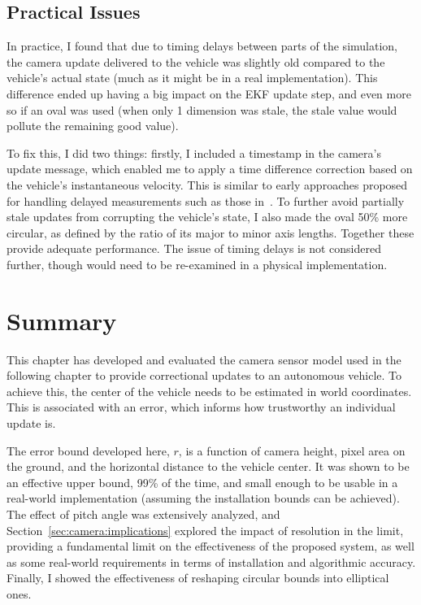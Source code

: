 \documentclass[a4paper,12pt,twoside,openright]{report}
\begin{document}
\subsection{Practical Issues}
In practice, I found that due to timing delays between parts of the simulation,
the camera update delivered to the vehicle was slightly old compared to the
vehicle's actual state (much as it might be in a real implementation). This
difference ended up having a big impact on the EKF update step, and even
more so if an oval was used (when only 1 dimension was stale, the stale
value would pollute the remaining good value).

To fix this, I did two things: firstly, I included a timestamp in the 
camera's update message, which enabled me to apply a time difference
correction based on the vehicle's instantaneous velocity. This is 
similar to early approaches proposed for handling delayed measurements
such as those in~\cite{larsen1998incorporation}\cite{tessier2006real}.
To further avoid partially stale updates from corrupting the vehicle's state,
I also made the oval 50\% more circular, as defined by the ratio
of its major to minor axis lengths. Together these 
provide adequate performance. The issue of timing delays is not considered 
further, though would need to be re-examined in a physical implementation.


\section{Summary}

This chapter has developed and evaluated the camera sensor model
used in the following chapter to provide correctional updates
to an autonomous vehicle. To achieve this, the center
of the vehicle needs to be estimated in world coordinates. This
is associated with an error, which informs how trustworthy
an individual update is.

The error bound developed here, $r$, is a function of camera height,
pixel area on the ground, and the horizontal distance to the vehicle center.
It was shown to be an effective upper bound, 99\% of the time, and
small enough to be usable in a real-world implementation (assuming
the installation bounds can be achieved). The effect of pitch angle
was extensively analyzed, and Section~\ref{sec:camera:implications}
explored the impact of resolution in the limit, providing a 
fundamental limit on the effectiveness of the proposed system,
as well as some real-world requirements in terms of
installation and algorithmic accuracy. Finally, I showed
the effectiveness of reshaping circular bounds into elliptical ones.
\end{document}
